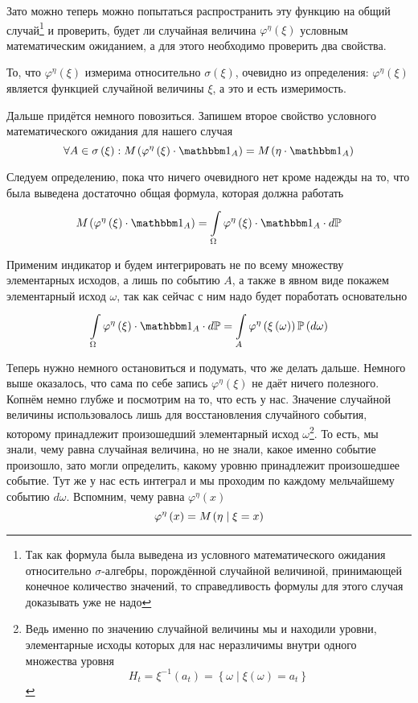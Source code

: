 Зато можно теперь можно попытаться распространить эту функцию
на общий случай\footnote{Так как формула была выведена из
условного математического ожидания относительно $\sigma$-алгебры,
порождённой случайной величиной, принимающей конечное количество значений,
то справедливость формулы для этого случая доказывать уже не надо}
и проверить, будет ли случайная величина $\varphi^{\eta}\left( \xi \right)$
условным математическим ожиданием,
а для этого необходимо проверить два свойства.

То, что $\varphi^{\eta}\left( \xi \right)$ измерима
относительно $\sigma\left( \xi \right)$,
очевидно из определения: $\varphi^{\eta}\left( \xi \right)$ является функцией
случайной величины $\xi$, а это и есть измеримость.

Дальше придётся немного повозиться.
Запишем второе свойство условного математического ожидания для нашего случая
$$\forall A \in \sigma\left( \xi \right):
    \mean{\left( \varphi^{\eta}\left( \xi \right) \cdot \indicatorof{A} \right)}
        =\mean{\left( \eta \cdot \indicatorof{A} \right)}$$

Следуем определению, пока что ничего очевидного нет кроме надежды на то,
что была выведена достаточно общая формула, которая должна работать
$$\mean{\left( \varphi^{\eta}\left( \xi \right) \cdot \indicatorof{A} \right)}
    = \integralc{\Omega}{}{d\mathbb{P}}{
    \varphi^{\eta}\left( \xi \right) \cdot \indicatorof{A} \cdot}$$

Применим индикатор и будем интегрировать
не по всему множеству элементарных исходов, а лишь по событию $A$,
а также в явном виде покажем элементарный исход $\omega$,
так как сейчас с ним надо будет поработать основательно
\begin{equation}\label{conditionalExpectationIntegralStart}
    \integralc{\Omega}{}{d\mathbb{P}}{
        \varphi^{\eta}\left( \xi \right) \cdot \indicatorof{A} \cdot}
    = \integralc{A}{}{\probability{d\omega}}{
        \varphi^{\eta}\left( \xi\left( \omega \right) \right)}
\end{equation}

Теперь нужно немного остановиться и подумать, что же делать дальше.
Немного выше оказалось, что сама по себе запись $\varphi^{\eta}\left( \xi \right)$
не даёт ничего полезного.
Копнём немно глубже и посмотрим на то, что есть у нас.
Значение случайной величины использовалось лишь
для восстановления случайного события,
которому принадлежит произошедший элементарный исход $\omega$\footnote{Ведь
именно по значению случайной величины мы и находили уровни, элементарные исходы
которых для нас неразличимы внутри одного множества уровня
$$H_t = \xi^{-1}\left( a_t \right)
    = \left\{ \omega \mid \xi\left( \omega \right) = a_t \right\}$$}.
То есть, мы знали, чему равна случайная величина,
но не знали, какое именно событие произошло,
зато могли определить, какому уровню принадлежит произошедшее событие.
Тут же у нас есть интеграл
и мы проходим по каждому мельчайшему событию $d\omega$.
Вспомним, чему равна $\varphi^{\eta}\left( x \right)$
$$\varphi^{\eta}\left( x \right) = M_{} \left( \eta \mid \xi = x \right)$$

